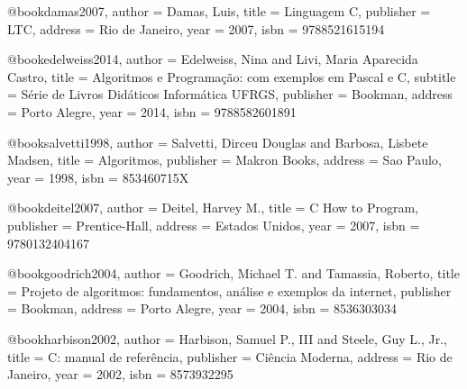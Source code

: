 
%

@book{damas2007,
  author = {Damas, Luis},
  title = {Linguagem C},
  publisher = {LTC},
  address = {Rio de Janeiro},
  year = {2007},
  isbn = {9788521615194}
}

@book{edelweiss2014,
  author = {Edelweiss, Nina and Livi, Maria Aparecida Castro},
  title = {Algoritmos e Programação: com exemplos em Pascal e C},
  subtitle = {Série de Livros Didáticos Informática UFRGS},
  publisher = {Bookman},
  address = {Porto Alegre},
  year = {2014},
  isbn = {9788582601891}
}

@book{salvetti1998,
  author = {Salvetti, Dirceu Douglas and Barbosa, Lisbete Madsen},
  title = {Algoritmos},
  publisher = {Makron Books},
  address = {Sao Paulo},
  year = {1998},
  isbn = {853460715X}
}

@book{deitel2007,
  author = {Deitel, Harvey M.},
  title = {C How to Program},
  publisher = {Prentice-Hall},
  address = {Estados Unidos},
  year = {2007},
  isbn = {9780132404167}
}

@book{goodrich2004,
  author = {Goodrich, Michael T. and Tamassia, Roberto},
  title = {Projeto de algoritmos: fundamentos, análise e exemplos da internet},
  publisher = {Bookman},
  address = {Porto Alegre},
  year = {2004},
  isbn = {8536303034}
}

@book{harbison2002,
  author = {Harbison, Samuel P., III and Steele, Guy L., Jr.},
  title = {C: manual de referência},
  publisher = {Ciência Moderna},
  address = {Rio de Janeiro},
  year = {2002},
  isbn = {8573932295}
}

